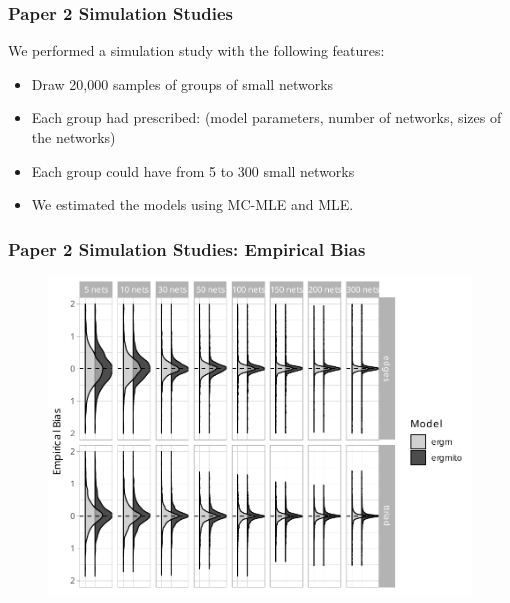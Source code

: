 \documentclass[aspectratio=169, 9pt]{beamer}\usepackage[]{graphicx}\usepackage[]{color}
\begin{document}
\begin{frame}[label=ergmitodgp]
\frametitle{Paper 2 Simulation Studies}

We performed a simulation study with the following features:

\begin{itemize}%
\item Draw 20,000 samples of groups of small networks
\item Each group had prescribed: (model parameters, number of networks, sizes of the networks)
\item Each group could have from 5 to 300 small networks
\item We estimated the models using MC-MLE and MLE.
\end{itemize}

\vfill\hfill\hyperlink{ergmitoexample}{}

\end{frame}



\begin{frame}[label=ergmito-bias]
\frametitle{Paper 2 Simulation Studies: Empirical Bias}

\begin{figure}
\centering
\includegraphics[width=.6\linewidth]{bias-02-various-sizes-4-5-ttriad.pdf}
\end{figure}

\vfill\hfill \hyperlink{ergmitoexperiment}{}

\end{frame}
\end{document}
